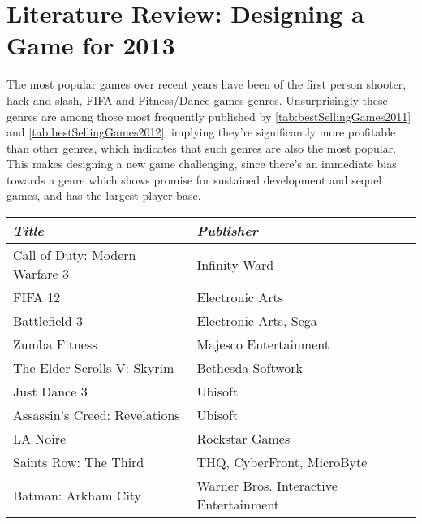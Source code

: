 
\section{Literature Review: Designing a Game for 2013}
\label{sec:litRevDesigningGame}

The most popular games over recent years have been of the first person shooter, hack and slash, FIFA and Fitness/Dance games genres. Unsurprisingly these genres are among those most frequently published by \ref{tab:bestSellingGames2011} and \ref{tab:bestSellingGames2012}, implying they're significantly more profitable than other genres, which indicates that such genres are also the most popular. This makes designing a new game challenging, since there's an immediate bias towards a genre which shows promise for sustained development and sequel games, and has the largest player base. 

\begin{table*}[!ht]
	\begin{tabular}{p{15em} p{13em}}
		\toprule
		\emph{Title} & \emph{Publisher}\\
		\midrule
	Call of Duty: Modern Warfare 3 & Infinity Ward
	\\
	FIFA 12 & Electronic Arts
	\\
	Battlefield 3 & Electronic Arts, Sega
	\\
	Zumba Fitness & Majesco Entertainment
	\\
	The Elder Scrolls V: Skyrim & Bethesda Softwork
	\\
	Just Dance 3 & Ubisoft
	\\
	Assassin's Creed: Revelations & Ubisoft
	\\
	LA Noire & Rockstar Games
	\\
	Saints Row: The Third & THQ, CyberFront, MicroByte
	\\
	Batman: Arkham City & Warner Bros. Interactive Entertainment 
	\\
	\bottomrule
	\end{tabular}
	\caption{Best selling games of 2011.}
	\label{tab:bestSellingGames2011}
\end{table*}

